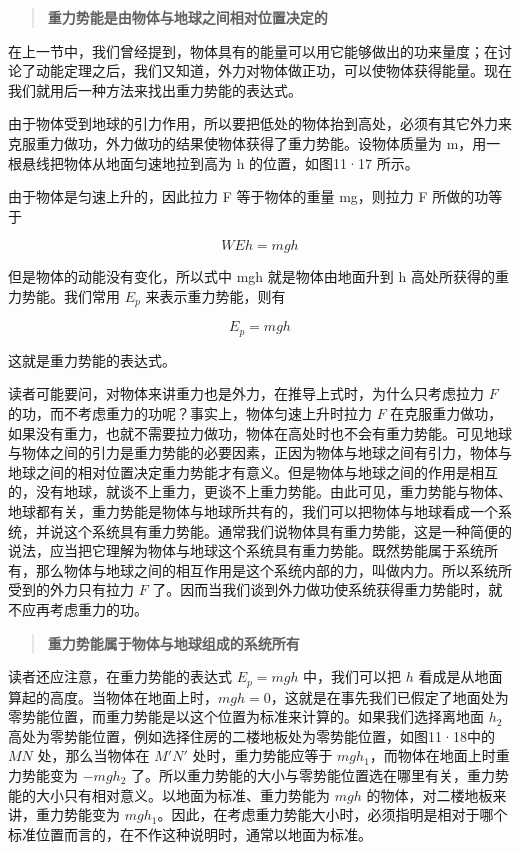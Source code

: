 \begin{quote}
\textbf{重力势能是由物体与地球之间相对位置决定的}
\end{quote}

在上一节中，我们曾经提到，物体具有的能量可以用它能够做出的功来量度；在讨论了动能定理之后，我们又知道，外力对物体做正功，可以使物体获得能量。现在我们就用后一种方法来找出重力势能的表达式。

由于物体受到地球的引力作用，所以要把低处的物体抬到高处，必须有其它外力来克服重力做功，外力做功的结果使物体获得了重力势能。设物体质量为
m，用一根悬线把物体从地面匀速地拉到高为 h 的位置，如图11·17 所示。

由于物体是匀速上升的，因此拉力 F 等于物体的重量 mg，则拉力 F
所做的功等于

\[
W E h = m g h
\]

但是物体的动能没有变化，所以式中 mgh 就是物体由地面升到 h
高处所获得的重力势能。我们常用 \(E_{p}\) 来表示重力势能，则有

\[
E _ {p} = m g h \tag{11.9}
\]

这就是重力势能的表达式。

读者可能要问，对物体来讲重力也是外力，在推导上式时，为什么只考虑拉力
\(F\) 的功，而不考虑重力的功呢？事实上，物体匀速上升时拉力 \(F\)
在克服重力做功，如果没有重力，也就不需要拉力做功，物体在高处时也不会有重力势能。可见地球与物体之间的引力是重力势能的必要因素，正因为物体与地球之间有引力，物体与地球之间的相对位置决定重力势能才有意义。但是物体与地球之间的作用是相互的，没有地球，就谈不上重力，更谈不上重力势能。由此可见，重力势能与物体、地球都有关，重力势能是物体与地球所共有的，我们可以把物体与地球看成一个系统，并说这个系统具有重力势能。通常我们说物体具有重力势能，这是一种简便的说法，应当把它理解为物体与地球这个系统具有重力势能。既然势能属于系统所有，那么物体与地球之间的相互作用是这个系统内部的力，叫做内力。所以系统所受到的外力只有拉力
\(F\)
了。因而当我们谈到外力做功使系统获得重力势能时，就不应再考虑重力的功。

\begin{quote}
\textbf{重力势能属于物体与地球组成的系统所有}
\end{quote}

读者还应注意，在重力势能的表达式 \(E_{p} = mgh\) 中，我们可以把 \(h\)
看成是从地面算起的高度。当物体在地面上时，\(mgh=0\)，这就是在事先我们已假定了地面处为零势能位置，而重力势能是以这个位置为标准来计算的。如果我们选择离地面
\(h_2\)
高处为零势能位置，例如选择住房的二楼地板处为零势能位置，如图11·18中的
\(MN\) 处，那么当物体在 \(M'N'\) 处时，重力势能应等于
\(mgh_1\)，而物体在地面上时重力势能变为 \(-mgh_2\)
了。所以重力势能的大小与零势能位置选在哪里有关，重力势能的大小只有相对意义。以地面为标准、重力势能为
\(mgh\) 的物体，对二楼地板来讲，重力势能变为
\(mgh_{1}\)。因此，在考虑重力势能大小时，必须指明是相对于哪个标准位置而言的，在不作这种说明时，通常以地面为标准。

